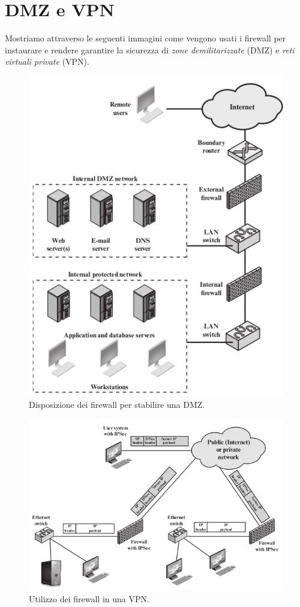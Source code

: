 \documentclass[a4paper, 11pt, notitlepage, fleqn]{report}
\begin{document}
\section{DMZ e VPN}
Mostriamo attraverso le seguenti immagini come vengono usati i firewall per instaurare e rendere garantire la sicurezza di \emph{zone demilitarizzate} (DMZ) e \emph{reti virtuali private} (VPN).
\begin{figure}
	\centering
	\includegraphics[width=.7\textwidth]{images/firewallSchema}
	\caption{Disposizione dei firewall per stabilire una DMZ.}
\end{figure}
\begin{figure}
	\centering
	\includegraphics[width=.9\textwidth]{images/VPN}
	\caption{Utilizzo dei firewall in una VPN.}
\end{figure}
\end{document}
